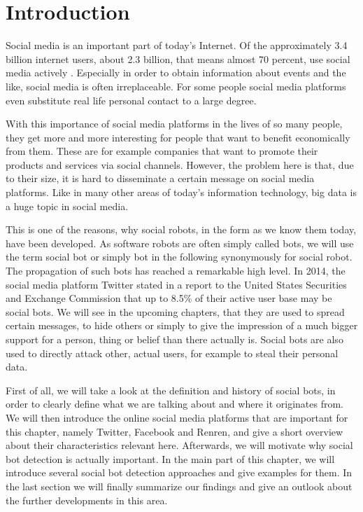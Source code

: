 \section{Introduction}
Social media is an important part of today's Internet.  Of the approximately 3.4 billion internet users, about 2.3 billion, that means almost 70 percent, use social media actively \cite{insight}. Especially in order to obtain information about events and the like, social media is often irreplaceable.  For some people social media platforms even substitute real life personal contact to a large degree.

With this importance of social media platforms in the lives of so many people, they get more and more interesting for people that want to benefit economically from them. These are for example companies that want to promote their products and services via social channels. However, the problem here is that, due to their size, it is hard to disseminate a certain message on social media platforms. Like in many other areas of today's  information technology, big data is a huge topic in social media.

This is one of the reasons, why social robots, in the form as we know them today, have been developed. As software robots are often simply called bots, we will use the term social bot or simply bot in the following synonymously for social robot. The propagation of such bots has reached a remarkable high level. In 2014, the social media platform Twitter stated in a report to the United States Securities and Exchange Commission that up to 8.5\% of their active user base may be social bots\cite{twitterbot}.  We will see in the upcoming chapters, that they are used to spread certain messages, to hide others or simply to give the impression of a much bigger support for a person, thing or belief than there actually is. Social bots are also used to directly attack other, actual users, for example to steal their personal data.

First of all, we will take a look at the definition and history of social bots, in order to clearly define what we are talking about and where it originates from. We will then introduce the online social media platforms that are important for this chapter, namely Twitter, Facebook and Renren, and give a short overview about their characteristics relevant here. Afterwards, we will motivate why social bot detection is actually important. In the main part of this chapter, we will introduce several social bot detection approaches and give examples for them. In the last section we will finally summarize our findings and give an outlook about the further developments in this area.

